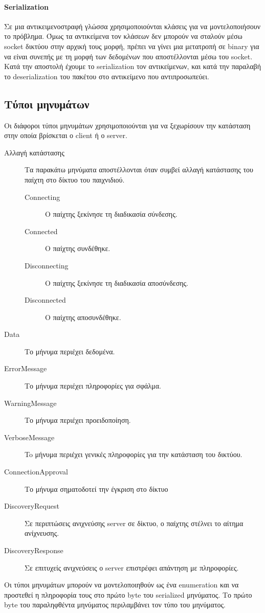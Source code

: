 		\paragraph{Serialization}
		Σε μια αντικειμενοστραφή γλώσσα χρησιμοποιούνται κλάσεις για να μοντελοποιήσουν το πρόβλημα. Όμως τα αντικείμενα τον κλάσεων δεν μπορούν να σταλούν μέσω socket δικτύου στην αρχική τους μορφή, πρέπει να γίνει μια μετατροπή σε binary για να είναι συνεπής με τη μορφή των δεδομένων που αποστέλλονται μέσω του socket. Κατά την αποστολή έχουμε το serialization τον αντικείμενων, και κατά την παραλαβή το deserialization του πακέτου στο αντικείμενο που αντιπροσωπεύει.
		\subsection{Τύποι μηνυμάτων}
		Οι διάφοροι τύποι μηνυμάτων χρησιμοποιούνται για να ξεχωρίσουν την κατάσταση στην οποία βρίσκεται ο client ή ο server.
			\begin{description}
				\item [Αλλαγή κατάστασης] Τα παρακάτω μηνύματα αποστέλλονται όταν συμβεί αλλαγή κατάστασης του παίχτη στο δίκτυο του παιχνιδιού.
				\begin{description}
					\item [Connecting] Ο παίχτης ξεκίνησε τη διαδικασία σύνδεσης.
					\item [Connected] Ο παίχτης συνδέθηκε.
					\item [Disconnecting] Ο παίχτης ξεκίνησε τη διαδικασία αποσύνδεσης.
					\item [Disconnected] Ο παίχτης αποσυνδέθηκε.
				\end{description}
				\item [Data] Το μήνυμα περιέχει δεδομένα.
				\item [ErrorMessage] Το μήνυμα περιέχει πληροφορίες για σφάλμα.
				\item [WarningMessage] Το μήνυμα περιέχει προειδοποίηση.
				\item [VerboseMessage] To μήνυμα περιέχει γενικές πληροφορίες για την κατάσταση του δικτύου.
				\item [ConnectionApproval] Το μήνυμα σηματοδοτεί την έγκριση στο δίκτυο
				\item [DiscoveryRequest] Σε περιπτώσεις ανιχνεύσης server σε δίκτυο, ο παίχτης στέλνει το αίτημα ανίχνευσης.
				\item [DiscoveryResponse] Σε επιτυχείς ανιχνεύσεις ο server επιστρέφει απάντηση με πληροφορίες. 
			\end{description}
		Οι τύποι μηνυμάτων μπορούν να μοντελοποιηθούν ως ένα enumeration και να προστεθεί η πληροφορία τους στο πρώτο byte του serialized μηνύματος. Το πρώτο byte του παραληφθέντα μηνύματος περιλαμβάνει τον τύπο του μηνύματος.
		
